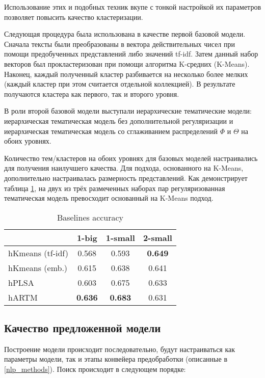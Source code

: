 Использование этих и подобных техник вкупе с тонкой настройкой их параметров позволяет повысить качество кластеризации.

Следующая процедура была использована в качестве первой базовой модели. Сначала тексты были преобразованы в вектора действительных чисел при помощи предобученных представлений либо значений tf-idf. Затем данный набор векторов был прокластеризован при помощи алгоритма K-средних (K-Means). Наконец, каждый полученный кластер разбивается на несколько более мелких (каждый кластер при этом считается отдельной коллекцией). В результате получаются кластера как первого, так и второго уровня.

В роли второй базовой модели выступали иерархические тематические модели: иерархическая тематическая модель без дополнительной регуляризации и иерархическая тематическая модель со сглаживанием распределений  $\Phi$ и $\Theta$ на обоих уровнях.

Количество тем/кластеров на обоих уровнях для базовых моделей настраивались для получения наилучшего качества. Для подхода, основанного на K-Means, дополнительно настраивалась размерность представлений. Как демонстрирует таблица  \ref{baselines}, на двух из трёх размеченных наборах пар регуляризованная тематическая модель превосходит основанный на K-Means подход.

\begin{table}[!h]
    \centering
\begin{tabular}{p{2.7cm}|c|c|c}
    \hline
    & 1-big           & 1-small            & 2-small            \\ \hline
    hKmeans (tf-idf)      & 0.568          & 0.593          & \textbf{0.649} \\
    hKmeans (emb.) & 0.615          & 0.638          & 0.641          \\
    hPLSA         & 0.603          & 0.675          & 0.633          \\
    hARTM         & \textbf{0.636} & \textbf{0.683} & 0.631          \\  \hline
\end{tabular}
    \caption{Baselines accuracy}
    \label{baselines}
\end{table}


\subsection{Качество предложенной модели}

Построение модели происходит последовательно, будут настраиваться как параметры модели, так и этапы конвейера предобработки (описанные в \ref{nlp_methods}). Поиск происходит в следующем порядке:

